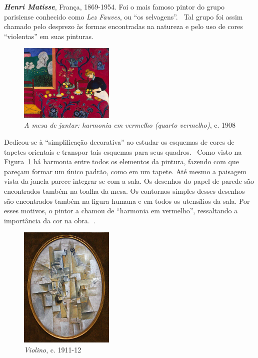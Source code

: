 \textbf{\emph{Henri Matisse}}, França, 1869-1954. Foi o mais famoso pintor do
grupo parisiense conhecido como \textit{Lez Fauves}, ou ``os
selvagens''.~\cite{elderfield,freeman} Tal grupo foi assim chamado pelo desprezo
às formas encontradas na natureza e pelo uso de cores ``violentas'' em suas
pinturas. 

\begin{figure}
  \begin{center}
    \includegraphics[width=0.4\textwidth]{figs/matisse_red.png}
  \end{center}
  \caption{\emph{A mesa de jantar: harmonia em vermelho (quarto vermelho)}, c. 1908}
  \label{fig:matisse:red}
\end{figure}

Dedicou-se à ``simplificação decorativa'' ao estudar os esquemas de cores de
tapetes orientais e transpor tais esquemas para seus quadros.~\cite{gombrich}
Como visto na Figura~\ref{fig:matisse:red} há harmonia entre todos os elementos
da pintura, fazendo com que pareçam formar um único padrão, como em um
tapete. Até mesmo a paisagem vista da janela parece integrar-se com a sala. Os
desenhos do papel de parede são encontrados também na toalha da mesa. Os
contornos simples desses desenhos são encontrados também na figura humana e em
todos os utensílios da sala. Por esses motivos, o pintor a chamou de ``harmonia
em vermelho'', ressaltando a importância da cor na obra.~\cite{matisse}.

\begin{figure}
  \begin{center}
    \includegraphics[width=0.4\textwidth]{figs/picasso_violino.png}
  \end{center}
  \caption{\emph{Violino}, c. 1911-12}
  \label{fig:picasso:violino}
\end{figure}

